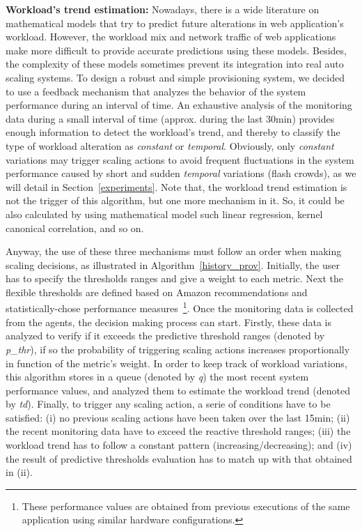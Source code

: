 \textbf{Workload's trend estimation:} Nowadays, there is a wide literature on mathematical models that try to predict future alterations in web application's workload. However, the workload mix and network traffic of web applications make more difficult to provide accurate predictions using these models. Besides, the complexity of these models sometimes prevent its integration into real auto scaling systems. To design a robust and simple provisioning system, we decided to use a feedback mechanism that analyzes the behavior of the system performance during an interval of time. An exhaustive analysis of the monitoring data during a small interval of time (approx. during the last 30min) provides enough information to detect the workload's trend, and thereby to classify the type of workload alteration as \emph{constant} or \emph{temporal}. Obviously, only \emph{constant} variations may trigger scaling actions to avoid frequent fluctuations in the system performance caused by short and sudden \emph{temporal} variations (flash crowds), as we will detail in Section~\ref{experiments}. Note that, the workload trend estimation is not the trigger of this algorithm, but one more mechanism in it. So, it could be also calculated by using mathematical model such linear regression, kernel canonical correlation, and so on.


\vspace{3mm}

Anyway, the use of these three mechanisms must follow an order when making scaling decisions, as illustrated in Algorithm~\ref{history_prov}. Initially, the user has to specify the thresholds ranges and give a weight to each metric. Next the flexible thresholds are defined based on Amazon recommendations and statistically-chose performance measures~\footnote{These performance values are obtained from previous executions of the same application using similar hardware configurations.}. Once the monitoring data is collected from the agents, the decision making process can start. Firstly, these data is analyzed to verify if it exceeds the predictive threshold ranges (denoted by \emph{p\_thr}), if so the probability of triggering scaling actions increases proportionally in function of the metric's weight. In order to keep track of workload variations, this algorithm stores in a queue (denoted by \emph{q}) the most recent system performance values, and analyzed them  to estimate the workload trend (denoted by \emph{td}). Finally, to trigger any scaling action, a serie of conditions have to be satisfied: (i) no previous scaling actions have been taken over the last 15min; (ii) the recent monitoring data have to exceed the reactive threshold ranges; (iii) the workload trend has to follow a constant pattern (increasing/decreasing); and (iv) the result of predictive thresholds evaluation has to match up with that obtained in (ii). 

